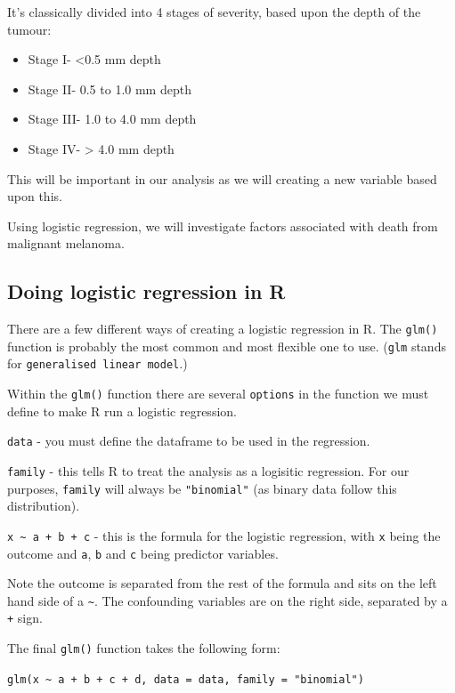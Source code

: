 \documentclass[]{book}
\providecommand{\tightlist}{%
  \setlength{\itemsep}{0pt}\setlength{\parskip}{0pt}}
\begin{document}
It's classically divided into 4 stages of severity, based upon the depth
of the tumour:

\begin{itemize}
\tightlist
\item
  Stage I- \textless{}0.5 mm depth
\item
  Stage II- 0.5 to 1.0 mm depth
\item
  Stage III- 1.0 to 4.0 mm depth
\item
  Stage IV- \textgreater{} 4.0 mm depth
\end{itemize}

This will be important in our analysis as we will creating a new
variable based upon this.

Using logistic regression, we will investigate factors associated with
death from malignant melanoma.

\subsection{Doing logistic regression in
R}\label{doing-logistic-regression-in-r}

There are a few different ways of creating a logistic regression in R.
The \texttt{glm()} function is probably the most common and most
flexible one to use. (\texttt{glm} stands for
\texttt{generalised\ linear\ model}.)

Within the \texttt{glm()} function there are several \texttt{options} in
the function we must define to make R run a logistic regression.

\texttt{data} - you must define the dataframe to be used in the
regression.

\texttt{family} - this tells R to treat the analysis as a logisitic
regression. For our purposes, \texttt{family} will always be
\texttt{"binomial"} (as binary data follow this distribution).

\texttt{x\ \textasciitilde{}\ a\ +\ b\ +\ c} - this is the formula for
the logistic regression, with \texttt{x} being the outcome and
\texttt{a}, \texttt{b} and \texttt{c} being predictor variables.

Note the outcome is separated from the rest of the formula and sits on
the left hand side of a \texttt{\textasciitilde{}}. The confounding
variables are on the right side, separated by a \texttt{+} sign.

The final \texttt{glm()} function takes the following form:

\texttt{glm(x\ \textasciitilde{}\ a\ +\ b\ +\ c\ +\ d,\ data\ =\ data,\ family\ =\ "binomial")}
\end{document}
